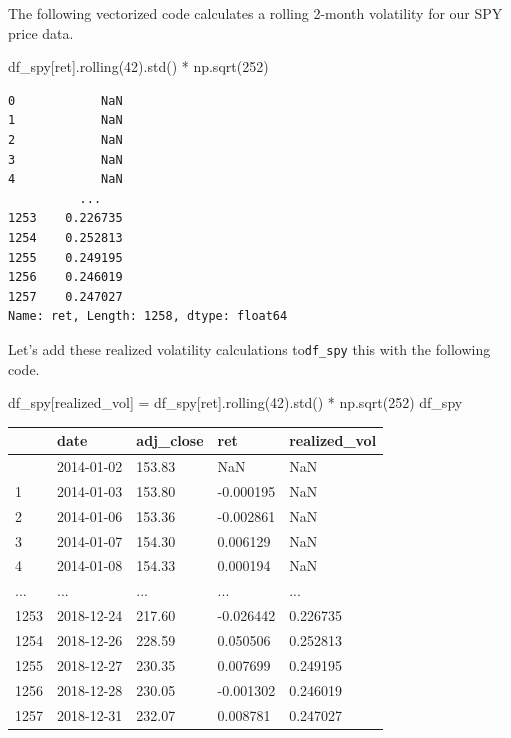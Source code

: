 \documentclass[
  letterpaper,
  DIV=11,
  numbers=noendperiod]{scrreprt}
\newenvironment{Shaded}{\begin{snugshade}}{\end{snugshade}}
\newcommand{\DecValTok}[1]{\textcolor[rgb]{0.68,0.00,0.00}{#1}}
\newcommand{\NormalTok}[1]{\textcolor[rgb]{0.00,0.23,0.31}{#1}}
\newcommand{\OperatorTok}[1]{\textcolor[rgb]{0.37,0.37,0.37}{#1}}
\newcommand{\StringTok}[1]{\textcolor[rgb]{0.13,0.47,0.30}{#1}}
\begin{document}
The following vectorized code calculates a rolling 2-month volatility
for our SPY price data.

\begin{Shaded}
\begin{Highlighting}[]
\NormalTok{df\_spy[}\StringTok{\textquotesingle{}ret\textquotesingle{}}\NormalTok{].rolling(}\DecValTok{42}\NormalTok{).std() }\OperatorTok{*}\NormalTok{ np.sqrt(}\DecValTok{252}\NormalTok{)}
\end{Highlighting}
\end{Shaded}

\begin{verbatim}
0            NaN
1            NaN
2            NaN
3            NaN
4            NaN
          ...   
1253    0.226735
1254    0.252813
1255    0.249195
1256    0.246019
1257    0.247027
Name: ret, Length: 1258, dtype: float64
\end{verbatim}

Let's add these realized volatility calculations to\texttt{df\_spy} this
with the following code.

\begin{Shaded}
\begin{Highlighting}[]
\NormalTok{df\_spy[}\StringTok{\textquotesingle{}realized\_vol\textquotesingle{}}\NormalTok{] }\OperatorTok{=}\NormalTok{ df\_spy[}\StringTok{\textquotesingle{}ret\textquotesingle{}}\NormalTok{].rolling(}\DecValTok{42}\NormalTok{).std() }\OperatorTok{*}\NormalTok{ np.sqrt(}\DecValTok{252}\NormalTok{)}
\NormalTok{df\_spy}
\end{Highlighting}
\end{Shaded}

\begin{longtable}[]{@{}lllll@{}}
\toprule\noalign{}
& date & adj\_close & ret & realized\_vol \\
\midrule\noalign{}
\endhead
\bottomrule\noalign{}
\endlastfoot
0 & 2014-01-02 & 153.83 & NaN & NaN \\
1 & 2014-01-03 & 153.80 & -0.000195 & NaN \\
2 & 2014-01-06 & 153.36 & -0.002861 & NaN \\
3 & 2014-01-07 & 154.30 & 0.006129 & NaN \\
4 & 2014-01-08 & 154.33 & 0.000194 & NaN \\
... & ... & ... & ... & ... \\
1253 & 2018-12-24 & 217.60 & -0.026442 & 0.226735 \\
1254 & 2018-12-26 & 228.59 & 0.050506 & 0.252813 \\
1255 & 2018-12-27 & 230.35 & 0.007699 & 0.249195 \\
1256 & 2018-12-28 & 230.05 & -0.001302 & 0.246019 \\
1257 & 2018-12-31 & 232.07 & 0.008781 & 0.247027 \\
\end{longtable}
\end{document}

